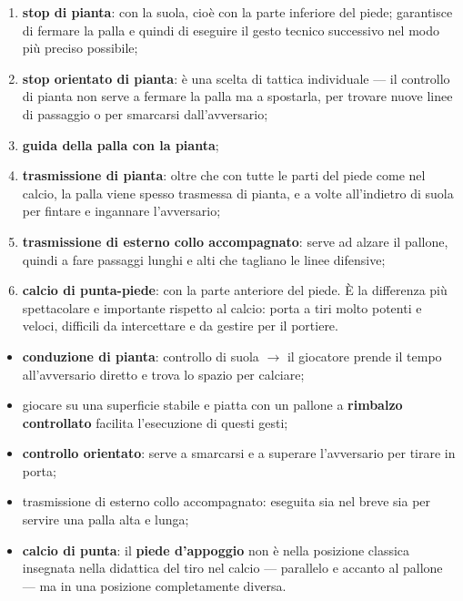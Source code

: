 \begin{enumerate}
  \item \textbf{stop di pianta}: con la suola, cioè con la parte inferiore del piede; garantisce di
    fermare la palla e quindi di eseguire il gesto tecnico successivo nel modo più preciso
    possibile;
  \item \textbf{stop orientato di pianta}: è una scelta di tattica individuale --- il controllo di
    pianta non serve a fermare la palla ma a spostarla, per trovare nuove linee di passaggio o per
    smarcarsi dall'avversario;
  \item \textbf{guida della palla con la pianta};
  \item \textbf{trasmissione di pianta}: oltre che con tutte le parti del piede come nel calcio, la
    palla viene spesso trasmessa di pianta, e a volte all'indietro di suola per fintare e ingannare
    l'avversario;
  \item \textbf{trasmissione di esterno collo accompagnato}: serve ad alzare il pallone, quindi a
    fare passaggi lunghi e alti che tagliano le linee difensive;
  \item \textbf{calcio di punta-piede}: con la parte anteriore del piede. È la differenza più
    spettacolare e importante rispetto al calcio: porta a tiri molto potenti e veloci, difficili da
    intercettare e da gestire per il portiere.
\end{enumerate}

\begin{itemize}
  \item \textbf{conduzione di pianta}: controllo di suola $\rightarrow$ il giocatore prende il tempo
    all'avversario diretto e trova lo spazio per calciare;
  \item giocare su una superficie stabile e piatta con un pallone a \textbf{rimbalzo controllato}
    facilita l'esecuzione di questi gesti;
  \item \textbf{controllo orientato}: serve a smarcarsi e a superare l'avversario per tirare in
    porta;
  \item trasmissione di esterno collo accompagnato: eseguita sia nel breve sia per servire una palla
    alta e lunga;
  \item \textbf{calcio di punta}: il \textbf{piede d'appoggio} non è nella posizione classica
    insegnata nella didattica del tiro nel calcio --- parallelo e accanto al pallone --- ma in una
    posizione completamente diversa.
\end{itemize}

